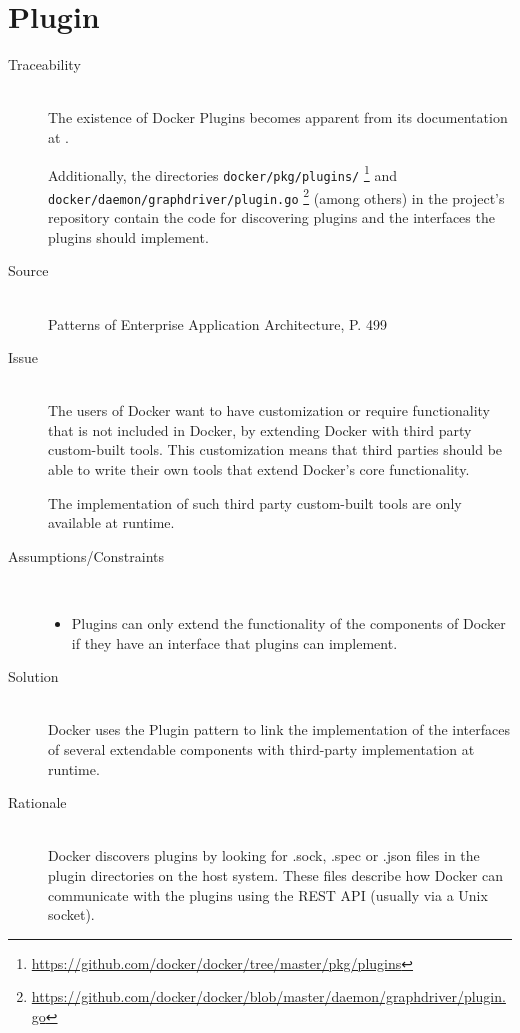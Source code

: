 \section{Plugin}
\label{sec:pattern-plugin}
\begin{description}

\item [Traceability]~\\
The existence of Docker Plugins becomes apparent from its documentation at \cite{dockerplugindocs}.

Additionally, the directories \verb|docker/pkg/plugins/| \footnote{\url{https://github.com/docker/docker/tree/master/pkg/plugins}} and \verb|  docker/daemon/graphdriver/plugin.go| \footnote{\url{https://github.com/docker/docker/blob/master/daemon/graphdriver/plugin.go}} (among others) in the project's repository contain the code for discovering plugins and the interfaces the plugins should implement.

\item [Source]~\\
Patterns of Enterprise Application Architecture, P. 499 \cite{eaa}

\item [Issue]~\\
The users of Docker want to have customization or require functionality that is not included in Docker, by extending Docker with third party custom-built tools. This customization means that third parties should be able to write their own tools that extend Docker's core functionality\cite{dockerpluginblog}.

The implementation of such third party custom-built tools are only available at runtime.

\item [Assumptions/Constraints]~
\begin{itemize}
\item Plugins can only extend the functionality of the components of Docker if they have an interface that plugins can implement.
\end{itemize}

\item [Solution]~\\
Docker uses the Plugin pattern to link the implementation of the interfaces of several extendable components with third-party implementation at runtime.

\item [Rationale] ~\\ %
Docker discovers plugins by looking for .sock, .spec or .json files in the plugin directories on the host system. These files describe how Docker can communicate with the plugins using the REST API (usually via a Unix socket).


\end{description}
